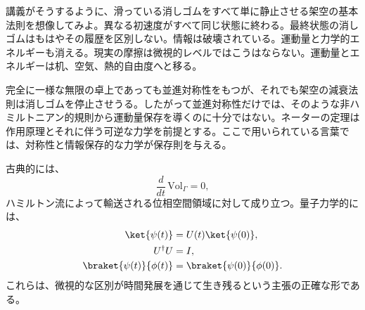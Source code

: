 \begin{classroomqa}
\end{classroomqa}

講義がそうするように、滑っている消しゴムをすべて単に静止させる架空の基本法則を想像してみよ。異なる初速度がすべて同じ状態に終わる。最終状態の消しゴムはもはやその履歴を区別しない。情報は破壊されている。運動量と力学的エネルギーも消える。現実の摩擦は微視的レベルではこうはならない。運動量とエネルギーは机、空気、熱的自由度へと移る。

完全に一様な無限の卓上であっても並進対称性をもつが、それでも架空の減衰法則は消しゴムを停止させうる。したがって並進対称性だけでは、そのような非ハミルトニアン的規則から運動量保存を導くのに十分ではない。ネーターの定理は作用原理とそれに伴う可逆な力学を前提とする。ここで用いられている言葉では、対称性と情報保存的な力学が保存則を与える。

\begin{classroomqa}
\end{classroomqa}

\begin{classroomqa}
\end{classroomqa}

古典的には、
\begin{equation}
\frac{d}{dt}\,\mathrm{Vol}_{\Gamma}=0,
\end{equation}
ハミルトン流によって輸送される位相空間領域に対して成り立つ。量子力学的には、
\begin{equation}
\begin{aligned}
\ket{\psi(t)}&=U(t)\ket{\psi(0)},\\
U^\dagger U&=I,\\
\braket{\psi(t)}{\phi(t)}
&=\braket{\psi(0)}{\phi(0)}.
\end{aligned}
\end{equation}
これらは、微視的な区別が時間発展を通じて生き残るという主張の正確な形である。

